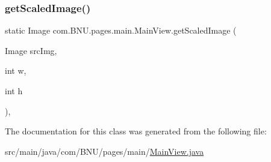 \subsubsection{\texorpdfstring{get\+Scaled\+Image()}{getScaledImage()}}
{\footnotesize\ttfamily static Image com.\+B\+N\+U.\+pages.\+main.\+Main\+View.\+get\+Scaled\+Image (\begin{DoxyParamCaption}\item[{Image}]{src\+Img,  }\item[{int}]{w,  }\item[{int}]{h }\end{DoxyParamCaption})\hspace{0.3cm}{\ttfamily [static]}, {\ttfamily [private]}}



The documentation for this class was generated from the following file\+:\begin{DoxyCompactItemize}
\item 
src/main/java/com/\+B\+N\+U/pages/main/\mbox{\hyperlink{_main_view_8java}{Main\+View.\+java}}\end{DoxyCompactItemize}
